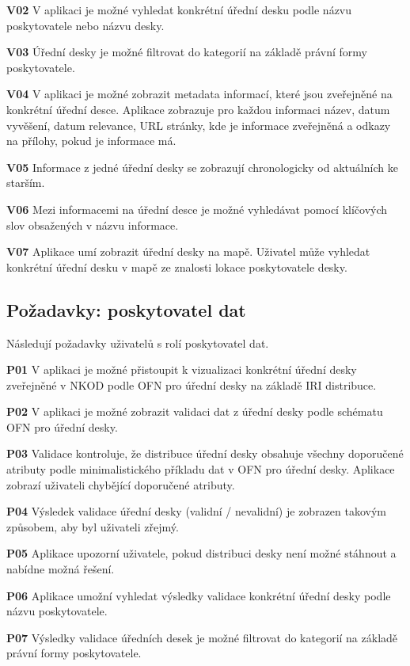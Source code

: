     \textbf{V02} V aplikaci je možné vyhledat konkrétní úřední desku podle názvu poskytovatele nebo názvu desky.
    
    \textbf{V03} Úřední desky je možné filtrovat do kategorií na základě právní formy poskytovatele.
    
    \textbf{V04} V aplikaci je možné zobrazit metadata informací, které jsou zveřejněné na konkrétní úřední desce. Aplikace zobrazuje pro každou informaci název, datum vyvěšení, datum relevance, URL stránky, kde je informace zveřejněná a odkazy na přílohy, pokud je informace má.
    
    \textbf{V05} Informace z jedné úřední desky se zobrazují chronologicky od aktuálních ke starším.
    
    \textbf{V06} Mezi informacemi na úřední desce je možné vyhledávat pomocí klíčových slov obsažených v názvu informace.
    
    \textbf{V07} Aplikace umí zobrazit úřední desky na mapě. Uživatel může vyhledat konkrétní úřední desku v mapě ze znalosti lokace poskytovatele desky.

\subsection{Požadavky: poskytovatel dat}

Následují požadavky uživatelů s rolí poskytovatel dat.

    \textbf{P01} V aplikaci je možné přistoupit k vizualizaci konkrétní úřední desky zveřejněné v NKOD podle OFN pro úřední desky na základě IRI distribuce. 

    \textbf{P02} V aplikaci je možné zobrazit validaci dat z úřední desky podle schématu OFN pro úřední desky.

    \textbf{P03} Validace kontroluje, že distribuce úřední desky obsahuje všechny doporučené atributy podle minimalistického příkladu dat v OFN pro úřední desky. Aplikace zobrazí uživateli chybějící doporučené atributy.
    
    \textbf{P04} Výsledek validace úřední desky (validní / nevalidní) je zobrazen takovým způsobem, aby byl uživateli zřejmý.
    
    \textbf{P05} Aplikace upozorní uživatele, pokud distribuci desky není možné stáhnout a nabídne možná řešení.
    
    \textbf{P06} Aplikace umožní vyhledat výsledky validace konkrétní úřední desky podle názvu poskytovatele.
    
    \textbf{P07} Výsledky validace úředních desek je možné filtrovat do kategorií na základě právní formy poskytovatele.
    
